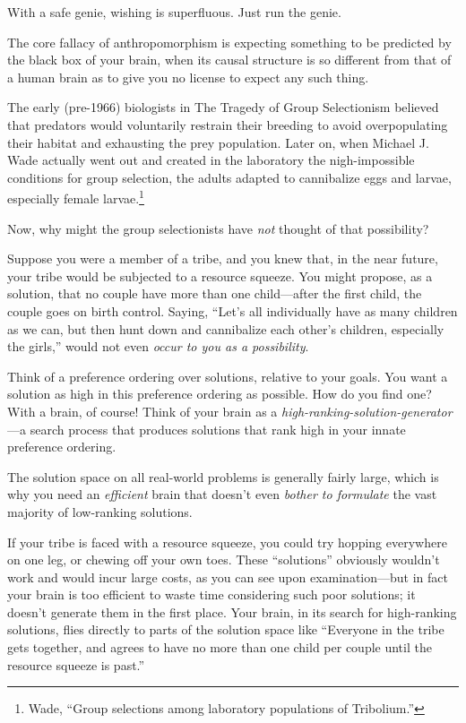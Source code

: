 {
 With a safe genie, wishing is superfluous. Just run the genie.}

\myendsectiontext


{
 The core fallacy of anthropomorphism is expecting something to be
predicted by the black box of your brain, when its causal structure is
so different from that of a human brain as to give you no license to
expect any such thing. }

{
 The early (pre-1966) biologists in The Tragedy of Group
Selectionism believed that predators would voluntarily restrain their
breeding to avoid overpopulating their habitat and exhausting the prey
population. Later on, when Michael J. Wade actually went out and
created in the laboratory the nigh-impossible conditions for group
selection, the adults adapted to cannibalize eggs and larvae,
especially female larvae.\footnote{Wade, ``Group selections among laboratory
populations of Tribolium.''}}

{
 Now, why might the group selectionists have \textit{not} thought
of that possibility?}

{
 Suppose you were a member of a tribe, and you knew that, in the
near future, your tribe would be subjected to a resource squeeze. You
might propose, as a solution, that no couple have more than one
child---after the first child, the couple goes on birth control.
Saying, ``Let's all individually have
as many children as we can, but then hunt down and cannibalize each
other's children, especially the
girls,'' would not even \textit{occur to you as a
possibility}.}

{
 Think of a preference ordering over solutions, relative to your
goals. You want a solution as high in this preference ordering as
possible. How do you find one? With a brain, of course! Think of your
brain as a \textit{high-ranking-solution-generator}{}---a search
process that produces solutions that rank high in your innate
preference ordering.}

{
 The solution space on all real-world problems is generally fairly
large, which is why you need an \textit{efficient} brain that
doesn't even \textit{bother to formulate} the vast
majority of low-ranking solutions.}

{
 If your tribe is faced with a resource squeeze, you could try
hopping everywhere on one leg, or chewing off your own toes. These
``solutions'' obviously
wouldn't work and would incur large costs, as you can
see upon examination---but in fact your brain is too efficient to waste
time considering such poor solutions; it doesn't
generate them in the first place. Your brain, in its search for
high-ranking solutions, flies directly to parts of the solution space
like ``Everyone in the tribe gets together, and agrees
to have no more than one child per couple until the resource squeeze is
past.''}

